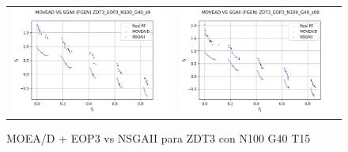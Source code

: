 \begin{figure}[H]
\begin{tabular}{c c}
    \includegraphics[scale=0.5]{figures/ZDT3_EOP3_N100_G40_T15/s9_comp.png} &
    \includegraphics[scale=0.5]{figures/ZDT3_EOP3_N100_G40_T15/s99_comp.png}\\
    \end{tabular}
    \caption{\centering MOEA/D + EOP3 vs NSGAII para ZDT3 con N100 G40 T15}
    \label{fig:11}
\end{figure}


